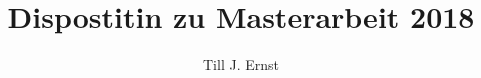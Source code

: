 


\title{Dispostitin zu Masterarbeit 2018}
\author{Till J. Ernst}











\begin{flushleft}
\nocite{*}
{}
\end{flushleft}


%
%
%